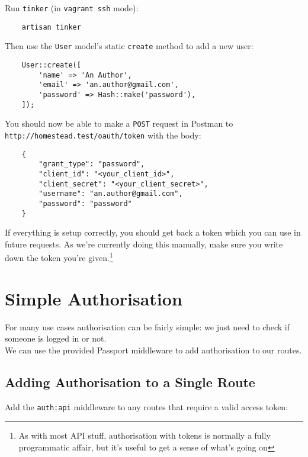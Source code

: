 Run \texttt{tinker} (in \texttt{vagrant ssh} mode):

\begin{verbatim}
    artisan tinker
\end{verbatim}

Then use the \texttt{User} model's static \texttt{create} method to add a new user:

\begin{verbatim}
    User::create([
        'name' => 'An Author',
        'email' => 'an.author@gmail.com',
        'password' => Hash::make('password'),
    ]);
\end{verbatim}

You should now be able to make a \texttt{POST} request in Postman to \\ \texttt{http://homestead.test/oauth/token} with the body:

\begin{verbatim}
    {
        "grant_type": "password",
        "client_id": "<your_client_id>",
        "client_secret": "<your_client_secret>",
        "username": "an.author@gmail.com",
        "password": "password"
    }
\end{verbatim}

If everything is setup correctly, you should get back a token which you can use in future requests. As we're currently doing this manually, make sure you write down the token you're given.\footnote{As with most API stuff, authorisation with tokens is normally a fully programmatic affair, but it's useful to get a sense of what's going on}


\pagebreak


\section{Simple Authorisation}

For many use cases authorisation can be fairly simple: we just need to check if someone is logged in or not.
\\

We can use the provided Passport middleware to add authorisation to our routes.


\subsection{Adding Authorisation to a Single Route}

Add the \texttt{auth:api} middleware to any routes that require a valid access token:

